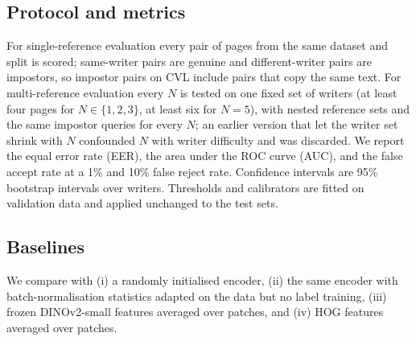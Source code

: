\subsection{Protocol and metrics}
For single-reference evaluation every pair of pages from the same dataset and split is scored; same-writer pairs are genuine and different-writer pairs are impostors, so impostor pairs on CVL include pairs that copy the same text.
For multi-reference evaluation every $N$ is tested on one fixed set of writers (at least four pages for $N\in\{1,2,3\}$, at least six for $N=5$), with nested reference sets and the same impostor queries for every $N$; an earlier version that let the writer set shrink with $N$ confounded $N$ with writer difficulty and was discarded.
We report the equal error rate (EER), the area under the ROC curve (AUC), and the false accept rate at a 1\% and 10\% false reject rate.
Confidence intervals are 95\% bootstrap intervals over writers.
Thresholds and calibrators are fitted on validation data and applied unchanged to the test sets.

\subsection{Baselines}
We compare with (i) a randomly initialised encoder, (ii) the same encoder with batch-normalisation statistics adapted on the data but no label training, (iii) frozen DINOv2-small features averaged over patches, and (iv) HOG features averaged over patches.
